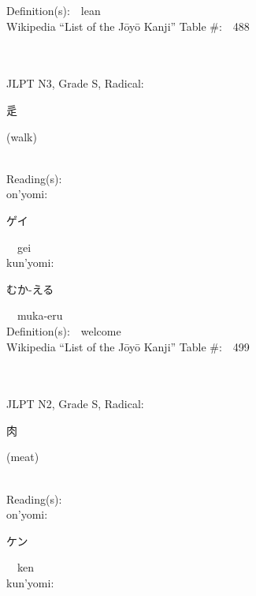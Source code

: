\begin{multicols}{2}
Definition(s):\ \ lean \\
Wikipedia ``List of the J\=oy\=o Kanji'' Table \#:\ \ 488 \\
\ \ \\
{\fontsize{34pt}{40pt}  }\ \ \\  %
{JLPT N3, Grade S, Radical:\ \ {\begin{CJK}{UTF8}{min} 辵 \end{CJK}} (walk) } \\
Reading(s):\ \ \\
{\hspace*{1em}}on'yomi:\ \ \\
{\hspace*{2em}}{\begin{CJK}{UTF8}{min} ゲイ \end{CJK}}\ \ gei\ \ \\
{\hspace*{1em}}kun'yomi:\ \ \\
{\hspace*{2em}}{\begin{CJK}{UTF8}{min} むか-える \end{CJK}}\ \ muka-eru\ \ \\
Definition(s):\ \ welcome \\
Wikipedia ``List of the J\=oy\=o Kanji'' Table \#:\ \ 499 \\
\ \ \\
{\fontsize{34pt}{40pt}  }\ \ \\  %
{JLPT N2, Grade S, Radical:\ \ {\begin{CJK}{UTF8}{min} 肉 \end{CJK}} (meat) } \\
Reading(s):\ \ \\
{\hspace*{1em}}on'yomi:\ \ \\
{\hspace*{2em}}{\begin{CJK}{UTF8}{min} ケン \end{CJK}}\ \ ken\ \ \\
{\hspace*{1em}}kun'yomi:\ \ \\

\end{multicols}
